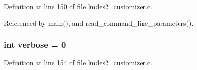 Definition at line 150 of file lmdes2\_\-customizer.c.

Referenced by main(), and read\_\-command\_\-line\_\-parameters().
\subsubsection{\setlength{\rightskip}{0pt plus 5cm}int \bf{verbose} = 0}\label{lmdes2__customizer_8c_0b2caeb4b6f130be43e5a2f0267dd453}




Definition at line 154 of file lmdes2\_\-customizer.c.